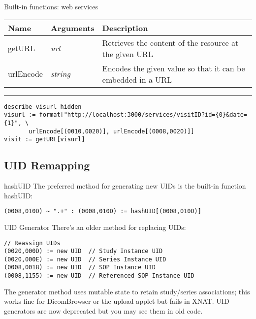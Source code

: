 \documentclass{beamer}  %
\begin{document}
\begin{frame}[fragile]{Built-in functions: web services}
\begin{center}
\small
\begin{tabular}{ l p{1in} p{2in} }
Name & Arguments & Description \\ \hline

getURL & {\em url} &
Retrieves the content of the resource at the given URL \\

\pause
urlEncode & {\em string} &
Encodes the given value so that it can be embedded in a URL \\

\end{tabular}
\end{center}

\pause
\hrule
\scriptsize
\begin{verbatim}
describe visurl hidden
visurl := format["http://localhost:3000/services/visitID?id={0}&date={1}", \
       urlEncode[(0010,0020)], urlEncode[(0008,0020)]]
visit := getURL[visurl]
\end{verbatim}

\end{frame}

\subsection{UID Remapping}
\begin{frame}[fragile]{hashUID}
The preferred method for generating new UIDs is the built-in function
hashUID:

\begin{verbatim}
(0008,010D) ~ ".+" : (0008,010D) := hashUID[(0008,010D)]
\end{verbatim}
\end{frame}

\begin{frame}[fragile]{UID Generator}
There's an older method for replacing UIDs:
\begin{verbatim}
// Reassign UIDs
(0020,000D) := new UID	// Study Instance UID
(0020,000E) := new UID	// Series Instance UID
(0008,0018) := new UID	// SOP Instance UID
(0008,1155) := new UID	// Referenced SOP Instance UID
\end{verbatim}
\pause
The generator method uses mutable state to retain study/series associations;
this works fine for DicomBrowser or the upload applet but fails in XNAT.
UID generators are now deprecated but you may see them in old code.
\end{frame}
\end{document}
